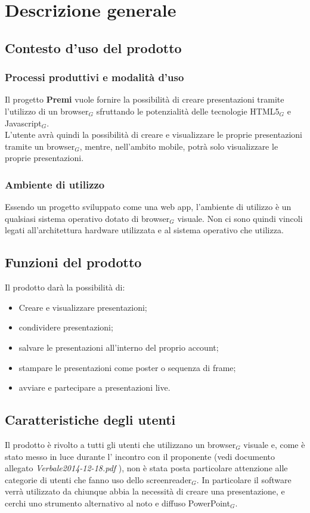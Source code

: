 \section{Descrizione generale}

\subsection{Contesto d'uso del prodotto}
\subsubsection{Processi produttivi e modalità d'uso}
Il progetto \textbf{Premi} vuole fornire la possibilità di creare presentazioni tramite l'utilizzo di un browser$_G$ sfruttando le potenzialità delle tecnologie HTML5$_G$ e Javascript$_G$. \\
L'utente avrà quindi la possibilità di creare e visualizzare le proprie presentazioni tramite un browser$_G$, mentre, nell'ambito mobile, potrà solo visualizzare le proprie presentazioni.

\subsubsection{Ambiente di utilizzo}
Essendo un progetto sviluppato come una web app, l'ambiente di utilizzo è un qualsiasi sistema operativo dotato di browser$_G$ visuale. Non ci sono quindi vincoli legati all'architettura hardware utilizzata e al sistema operativo che utilizza.


\subsection{Funzioni del prodotto}
Il prodotto darà la possibilità di:
\begin{itemize}
	\item Creare e visualizzare presentazioni;
	\item condividere presentazioni;
	\item salvare le presentazioni all'interno del proprio account;
	\item stampare le presentazioni come poster o sequenza di frame;
	\item avviare e partecipare a presentazioni live.
\end{itemize}

\subsection{Caratteristiche degli utenti}
Il prodotto è rivolto a tutti gli utenti che utilizzano un browser$_G$ visuale e, come è stato messo in luce durante l' incontro con il proponente (vedi documento allegato \textit{Verbale2014-12-18.pdf} ), non è stata posta particolare attenzione alle categorie di utenti che fanno uso dello screenreader$_G$. In particolare il software verrà utilizzato da chiunque abbia la necessità di creare una presentazione, e cerchi uno strumento alternativo al noto e diffuso PowerPoint$_G$.

